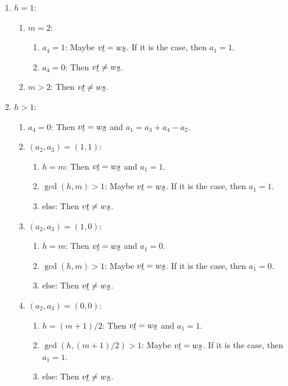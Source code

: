 \begin{prop}
	\begin{enumerate}
		\item $h=1$:
			\begin{enumerate}
				\item $m=2$:
					\begin{enumerate}
						\item $a_4=1$:
							Maybe $v \underline{t} = w \underline{s}$. If it is the case, then $a_1 = 1$.
						\item $a_4=0$:
							Then $v \underline{t} \neq w \underline{s}$.
					\end{enumerate}
				\item $m>2$:
					Then $v \underline{t} \neq w \underline{s}$.
			\end{enumerate}
		\item $h>1$:
			\begin{enumerate}
				\item $a_4=0$:
					Then $v \underline{t} = w \underline{s}$ and $a_1 = a_3 + a_4 - a_2$.
				\item $(a_2,a_3)=(1,1)$:
					\begin{enumerate}
						\item $h=m$: Then $v \underline{t} = w \underline{s}$ and $a_1 = 1$.
						\item $\gcd(h,m)>1$: Maybe $v \underline{t} = w \underline{s}$. If it is the case, then $a_1 = 1$.
						\item $\textrm{else}$: Then $v \underline{t} \neq w \underline{s}$.
					\end{enumerate}
				\item $(a_2,a_3)=(1,0)$:
					\begin{enumerate}
						\item $h=m$: Then $v \underline{t} = w \underline{s}$ and $a_1 = 0$.
						\item $\gcd(h,m)>1$: Maybe $v \underline{t} = w \underline{s}$. If it is the case, then $a_1 = 0$.
						\item $\textrm{else}$: Then $v \underline{t} \neq w \underline{s}$.
					\end{enumerate}
				\item $(a_2,a_3)=(0,0)$:
					\begin{enumerate}
						\item $h=(m+1)/2$: Then $v \underline{t} = w \underline{s}$ and $a_1 = 1$.
						\item $\gcd(h,(m+1)/2)>1$: Maybe $v \underline{t} = w \underline{s}$. If it is the case, then $a_1 = 1$.
						\item $\textrm{else}$: Then $v \underline{t} \neq w \underline{s}$.
					\end{enumerate}
			\end{enumerate}
	\end{enumerate}


\end{prop}
